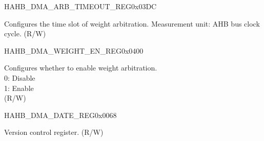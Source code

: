 \begin{register}{H}{AHB\_DMA\_ARB\_TIMEOUT\_REG}{0x03DC}\label{regdesc:AHBDMAARBTIMEOUTREG}
%
%
\regnewline%
\begin{regdesc}\begin{reglist}
\label{fielddesc:AHBDMAARBTIMEOUT}\item [AHB\_DMA\_ARB\_TIMEOUT] Configures the time slot of weight arbitration. Measurement unit: AHB bus clock cycle. (R/W)
\end{reglist}\end{regdesc}
\end{register}


\begin{register}{H}{AHB\_DMA\_WEIGHT\_EN\_REG}{0x0400}\label{regdesc:AHBDMAWEIGHTENREG}
%
%
\regnewline%
\begin{regdesc}\begin{reglist}
\label{fielddesc:AHBDMAWEIGHTEN}\item [AHB\_DMA\_WEIGHT\_EN] Configures whether to enable weight arbitration.\\
0: Disable\\
1: Enable\\ (R/W)
\end{reglist}\end{regdesc}
\end{register}


\begin{register}{H}{AHB\_DMA\_DATE\_REG}{0x0068}\label{regdesc:AHBDMADATEREG}
%
\regnewline%
\begin{regdesc}\begin{reglist}
\label{fielddesc:AHBDMADATE}\item [AHB\_DMA\_DATE] Version control register. (R/W)
\end{reglist}\end{regdesc}
\end{register}


